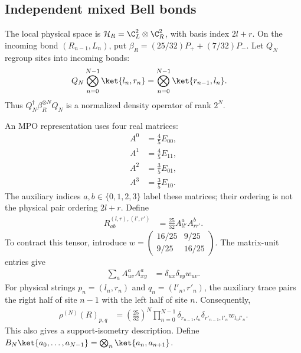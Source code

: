 \subsection{Independent mixed Bell bonds}

The local physical space is
$\mathcal H_R=\C^2_L\otimes\C^2_R$, with basis index $2l+r$.
On the incoming bond $(R_{n-1},L_n)$, put
$\beta_R=(25/32)P_++(7/32)P_-$.
Let $Q_N$ regroup sites into incoming bonds:
\begin{align}
    Q_N\bigotimes_{n=0}^{N-1}\ket{l_n,r_n}
     & =\bigotimes_{n=0}^{N-1}\ket{r_{n-1},l_n}.
    \label{eq:asymex_R_regroup}
\end{align}
Thus $Q_N^\dagger\beta_R^{\otimes N}Q_N$ is a normalized density operator
of rank $2^N$.

An MPO representation uses four real matrices:
\begin{align}
    A^0 & =\tfrac45E_{00}, \nonumber \\
    A^1 & =\tfrac45E_{11}, \nonumber \\
    A^2 & =\tfrac35E_{01}, \nonumber \\
    A^3 & =\tfrac35E_{10}.
    \label{eq:asymex_one_label_matrices}
\end{align}
The auxiliary indices $a,b\in\{0,1,2,3\}$ label these matrices; their
ordering is not the physical pair ordering $2l+r$. Define
\begin{align}
    R^{(l,r),(l',r')}_{ab}
     & =\frac{25}{32}A^a_{ll'}A^b_{rr'}.
    \label{eq:asymex_R_tensor}
\end{align}
To contract this tensor, introduce
$w=\left(\begin{smallmatrix}16/25&9/25\\9/25&16/25\end{smallmatrix}\right)$.
The matrix-unit entries give
\begin{align}
    \sum_a A^a_{uv}A^a_{xy} & =\delta_{ux}\delta_{vy}w_{uv}.
    \label{eq:asymex_R_contraction}
\end{align}
For physical strings $p_n=(l_n,r_n)$ and $q_n=(l'_n,r'_n)$, the auxiliary
trace pairs the right half of site $n-1$ with the left half of site $n$.
Consequently,
\begin{align}
    \rho^{(N)}(R)_{p,q}
     & =\left(\frac{25}{32}\right)^N
    \prod_{n=0}^{N-1}
    \delta_{r_{n-1},l_n}\delta_{r'_{n-1},l'_n}w_{l_nl'_n}.
    \label{eq:asymex_R_entries}
\end{align}
This also gives a support-isometry description. Define
$B_N\ket{a_0,\ldots,a_{N-1}}=\bigotimes_n\ket{a_n,a_{n+1}}$.
